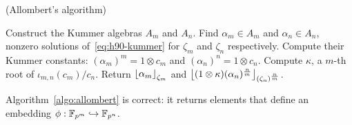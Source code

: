 \begin{algorithm}
  \caption{(Allombert's algorithm)}
  \label{algo:allombert}
  \begin{algorithmic}[1]
  \State Construct the Kummer algebras $A_m$ and $A_n$.
  \State Find $\alpha_m\in A_m$ and $\alpha_n\in A_n$, nonzero solutions
  of~\eqref{eq:h90-kummer} for $\zeta_m$
  and $\zeta_n$ respectively.
  \State Compute their Kummer constants: $(\alpha_m)^m=1\otimes c_m$ and
  $(\alpha_n)^n=1\otimes c_n$.
  \State Compute $\kappa$, a $m$-th root of $\iota_{m, n}(c_m)/c_n$.
  \State Return $\left\lfloor \alpha_{m} \right\rfloor_{\zeta_m}$ and
  $\left\lfloor (1\otimes\kappa)(\alpha_n)^{\frac{n}{m}} \right\rfloor_{(\zeta_n)^{\frac{n}{m}}}$.
  \end{algorithmic}
\end{algorithm}
\begin{prop}
  \label{prop:allombert-works}
  Algorithm~\ref{algo:allombert} is correct: it returns elements that define an
  embedding $\phi:\mathbb{F}_{p^{m}}\hookrightarrow\mathbb{F}_{p^{n}}$.
\end{prop}

